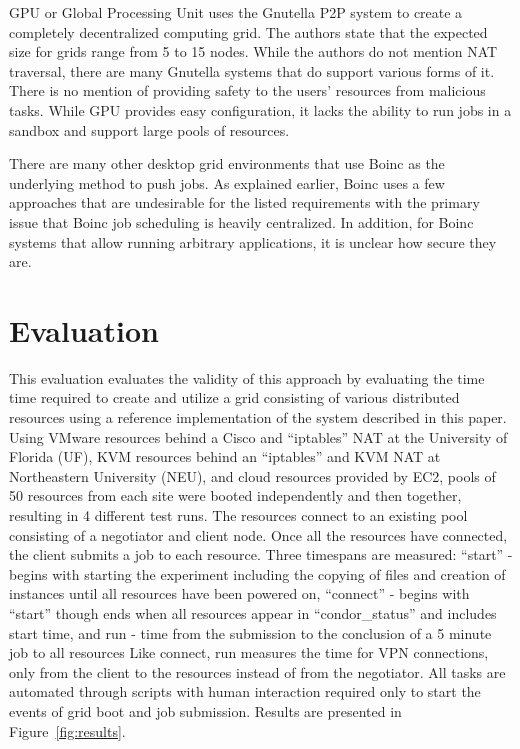 GPU or Global Processing Unit uses the Gnutella P2P system to create a
completely decentralized computing grid.  The authors state that the expected
size for grids range from 5 to 15 nodes.  While the authors do not mention NAT
traversal, there are many Gnutella systems that do support various forms of it.
There is no mention of providing safety to the users' resources from malicious
tasks.  While GPU provides easy configuration, it lacks the ability to run
jobs in a sandbox and support large pools of resources.

There are many other desktop grid environments that use Boinc as the underlying
method to push jobs.  As explained earlier, Boinc uses a few approaches that
are undesirable for the listed requirements with the primary issue that Boinc
job scheduling is heavily centralized.  In addition, for Boinc systems that
allow running arbitrary applications, it is unclear how secure they are.

\section{Evaluation}
\label{evaluation}
This evaluation evaluates the validity of this approach by evaluating the time
time required to create and utilize a grid consisting of various distributed
resources using a reference implementation of the system described in this
paper.  Using VMware resources behind a Cisco and ``iptables'' NAT at the
University of Florida (UF), KVM resources behind an ``iptables'' and KVM NAT at
Northeastern University (NEU), and cloud resources provided by EC2, pools of 50
resources from each site were booted independently and then together, resulting
in 4 different test runs.  The resources connect to an existing pool consisting
of a negotiator and client node.  Once all the resources have connected, the
client submits a job to each resource.  Three timespans are measured: ``start''
- begins with starting the experiment including the copying of files and
creation of instances until all resources have been powered on, ``connect'' -
begins with ``start'' though ends when all resources appear in
``condor\_status'' and includes start time, and run - time from the submission
to the conclusion of a 5 minute job to all resources Like connect, run measures
the time for VPN connections, only from the client to the resources instead of
from the negotiator.  All tasks are automated through scripts with human
interaction required only to start the events of grid boot and job submission.
Results are presented in Figure~\ref{fig:results}.


